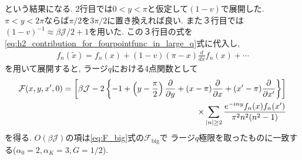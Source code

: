 という結果になる. 
2行目では$0 < y < \pi$と仮定して$(1 - v)$で展開した. 
$\pi < y < 2\pi$ならば$\pi / 2$を$3\pi / 2$に置き換えれば良い. 
また３行目では$(1-v)^{-1}\approx \beta\mathcal{J}/2 + 1$を用いた. 
この３行目の式を\eqref{eq:h2_contribution_for_fourpointfunc_in_large_q}式に代入し, 
\begin{align}
	f_n(\tilde{x}) = f_n(x) + (1-v)(\pi - x)\frac{d}{dx}f_n(x) + \cdots
\end{align}
を用いて展開すると, ラージ$q$における4点関数として
\begin{align}
	\mathcal{F}(x, y, x', 0)
	= \left[
		\beta\mathcal{J} - 2\left\{-1 + \left(y - \frac{\pi}{2}\right)\frac{\partial}{\partial y}
		+ (x-\pi)\frac{\partial}{\partial x} + (x' - \pi)\frac{\partial}{\partial x'}\right\}
	\right]\nonumber\\
	\times \sum_{|n|\geq 2} \frac{e^{-iny}f_n(x)f_n(x')}{\pi^2n^2(n^2-1)}
	\label{eq:fourpointfunc_in_large_q_upto_order1}
\end{align}
を得る. 
$O(\beta\mathcal{J})$の項は\eqref{eq:F_big}式の$\mathcal{F}_{\mathrm{big}}$で
ラージ$q$極限を取ったものに一致する($\alpha_0=2, \alpha_K=3, G=1/2$). 

